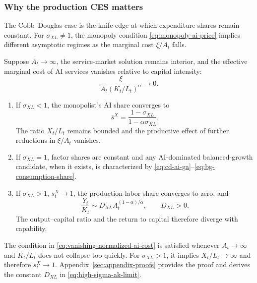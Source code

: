 \subsubsection{Why the production CES matters}

The Cobb--Douglas case is the knife-edge at which expenditure shares remain
constant. For $\sigma_{XL}\neq1$, the monopoly condition
\eqref{eq:monopoly-ai-price} implies different asymptotic regimes as the marginal
cost $\xi/A_t$ falls.

\begin{conditionalresult}
\label{cond:production-ces-regimes}
Suppose $A_t\to\infty$, the service-market solution remains interior, and the
effective marginal cost of AI services vanishes relative to capital intensity:
\begin{equation}
    \frac{\xi}{A_t(K_t/L_t)^\alpha}\longrightarrow0.
    \label{eq:vanishing-normalized-ai-cost}
\end{equation}
\begin{enumerate}[label=(\roman*)]
    \item If $\sigma_{XL}<1$, the monopolist's AI share converges to
    \begin{equation}
        \bar s^X
        =
        \frac{1-\sigma_{XL}}{1-\alpha\sigma_{XL}}.
        \label{eq:low-sigma-ai-share}
    \end{equation}
    The ratio $X_t/L_t$ remains bounded and the productive effect of further
    reductions in $\xi/A_t$ vanishes.
    \item If $\sigma_{XL}=1$, factor shares are constant and any AI-dominated
    balanced-growth candidate, when it exists, is characterized by
    \eqref{eq:cd-ai-ga}--\eqref{eq:bg-consumption-share}.
    \item If $\sigma_{XL}>1$, $s^X_t\to1$, the production-labor share converges to zero,
    and
    \begin{equation}
        \frac{Y_t}{K_t}
        \sim
        D_{XL} A_t^{(1-\alpha)/\alpha},
        \qquad D_{XL}>0.
        \label{eq:high-sigma-ak-limit}
    \end{equation}
    The output--capital ratio and the return to capital therefore diverge with
    capability.
\end{enumerate}
\end{conditionalresult}

The condition in \eqref{eq:vanishing-normalized-ai-cost} is satisfied whenever
$A_t\to\infty$ and $K_t/L_t$ does not collapse too quickly. For
$\sigma_{XL}>1$, it implies $X_t/L_t\to\infty$ and therefore $s^X_t\to1$.
Appendix~\ref{sec:appendix-proofs} provides the proof and derives the constant
$D_{XL}$ in \eqref{eq:high-sigma-ak-limit}.

